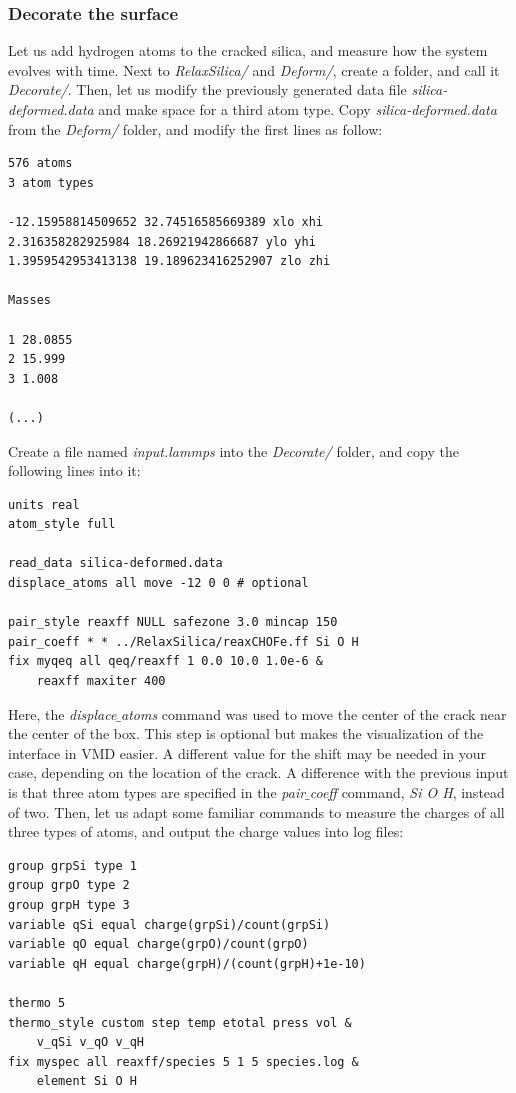 \documentclass[9pt,tutorial]{livecoms}
\begin{document}
\subsubsection{Decorate the surface}
Let us add hydrogen atoms to the cracked silica, and measure how the system evolves with time. Next to \textit{RelaxSilica/} and \textit{Deform/}, create a folder, and call it \textit{Decorate/}. Then, let us modify the previously generated data file
\textit{silica-deformed.data} and make space for a third atom type. Copy \textit{silica-deformed.data} from the \textit{Deform/} folder, and modify the first lines as follow:
{\normalsize \begin{verbatim}
576 atoms
3 atom types

-12.15958814509652 32.74516585669389 xlo xhi
2.316358282925984 18.26921942866687 ylo yhi
1.3959542953413138 19.189623416252907 zlo zhi

Masses

1 28.0855
2 15.999
3 1.008

(...)
\end{verbatim}}
Create a file named \textit{input.lammps} into the \textit{Decorate/} folder, and copy the following lines into it:
{\normalsize \begin{verbatim}
units real
atom_style full

read_data silica-deformed.data
displace_atoms all move -12 0 0 # optional

pair_style reaxff NULL safezone 3.0 mincap 150
pair_coeff * * ../RelaxSilica/reaxCHOFe.ff Si O H
fix myqeq all qeq/reaxff 1 0.0 10.0 1.0e-6 &
    reaxff maxiter 400
\end{verbatim}}
Here, the \textit{displace$\_$atoms} command was used to move the center of the crack near the center of the box. This step is optional but makes the visualization of the interface in VMD easier. A different value for the shift may be needed in your case, depending on the location of the crack. A difference with the previous input is that three atom types are specified
in the \textit{pair$\_$coeff} command, \textit{Si O H}, instead of two. Then, let us adapt some familiar commands to measure the charges of all three types of atoms, and output the charge values into log files:
{\normalsize \begin{verbatim}
group grpSi type 1
group grpO type 2
group grpH type 3
variable qSi equal charge(grpSi)/count(grpSi)
variable qO equal charge(grpO)/count(grpO)
variable qH equal charge(grpH)/(count(grpH)+1e-10)

thermo 5
thermo_style custom step temp etotal press vol &
    v_qSi v_qO v_qH
fix myspec all reaxff/species 5 1 5 species.log &
    element Si O H
\end{verbatim}}
\end{document}

